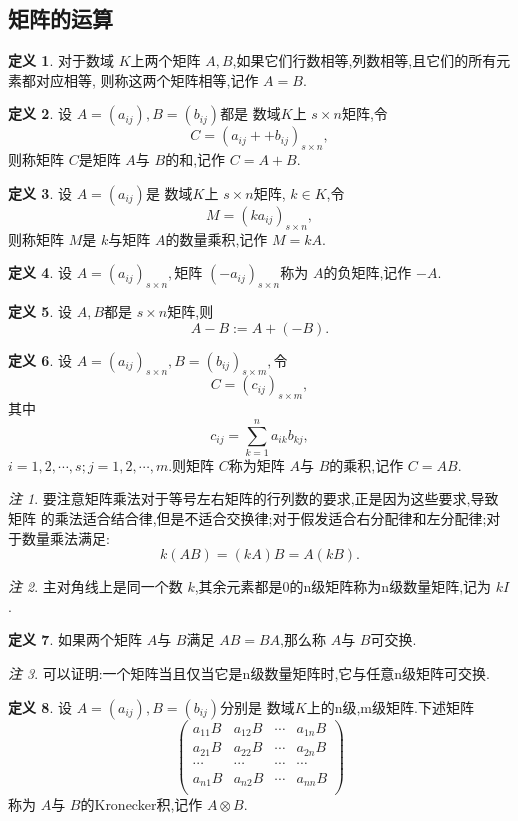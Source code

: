 \documentclass[a4paper,11pt]{article}%
\theoremstyle{remark}
\newtheorem*{remark}{注}
\theoremstyle{definition}
\theoremstyle{definition}
\newtheorem*{definition}{定义}
\theoremstyle{plain}
\begin{document}
\subsection{矩阵的运算}
\begin{definition}
    对于数域 $K$上两个矩阵 $A,B$,如果它们行数相等,列数相等,且它们的所有元素都对应相等,
    则称这两个矩阵相等,记作 $A=B$.
\end{definition}
\begin{definition}
    设 $A=(a_{ij}),B=(b_{ij})$都是 数域$K$上 $s\times n$矩阵,令
    \[C=(a_{ij}++b_{ij})_{s\times n},\]
    则称矩阵 $C$是矩阵 $A$与 $B$的和,记作 $C=A+B$.
\end{definition}
\begin{definition}
    设 $A=(a_{ij})$是 数域$K$上 $s\times n$矩阵, $k\in K$,令
    \[M=(k a_{ij})_{s\times n},\]
    则称矩阵 $M$是 $k$与矩阵 $A$的数量乘积,记作 $M=kA$.
\end{definition}
\begin{definition}
    设 $A=(a_{ij})_{s\times n},$矩阵 $(-a_{ij})_{s\times n}$称为 $A$的负矩阵,记作 $-A$.
\end{definition}
\begin{definition}
    设 $A,B$都是 $s\times n$矩阵,则
    \[A-B:=A+(-B).\]
\end{definition}
\begin{definition}
    设 $A=(a_{ij})_{s\times n},B=(b_{ij})_{s\times m},$令
    \[C=(c _{ij})_{s\times m},\]
    其中
    \[c _{ij}=\sum_{k=1}^{n}{a_{ik}b_{kj}},\]
    $i=1,2,\cdots,s;j=1,2,\cdots,m.$则矩阵 $C$称为矩阵 $A$与 $B$的乘积,记作
    $C=AB.$
\end{definition}
\begin{remark}
    要注意矩阵乘法对于等号左右矩阵的行列数的要求,正是因为这些要求,导致矩阵
    的乘法适合结合律,但是不适合交换律;对于假发适合右分配律和左分配律;对于数量乘法满足:
    \[k(AB)=(kA)B=A(kB).\]
\end{remark}
\begin{remark}
    主对角线上是同一个数 $k$,其余元素都是0的n级矩阵称为n级数量矩阵,记为 $kI$.
\end{remark}
\begin{definition}
    如果两个矩阵 $A$与 $B$满足 $AB=BA$,那么称 $A$与 $B$可交换.
\end{definition}
\begin{remark}
    可以证明:一个矩阵当且仅当它是n级数量矩阵时,它与任意n级矩阵可交换.
\end{remark}
\begin{definition}
    设 $A=(a _{ij}),B=(b _{ij})$分别是 数域$K$上的n级,m级矩阵.下述矩阵
    \[\begin{pmatrix}
        a_{11}B&a_{12}B&\cdots&a_{1n}B\\
        a_{21}B&a_{22}B&\cdots&a_{2n}B\\
        \cdots & \cdots & \cdots & \cdots \\
        a_{n1}B&a_{n2}B&\cdots&a_{nn}B\\
    \end{pmatrix}\]
    称为 $A$与 $B$的Kronecker积,记作 $A\otimes B$.
\end{definition}
\end{document}
